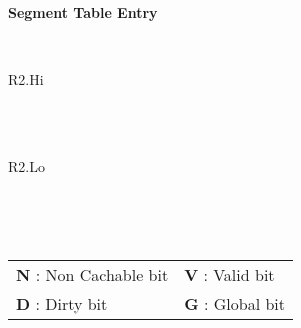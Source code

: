 \begin{minipage}{\textwidth}
\begin{framed}
	\begin{center}
		\textbf{Segment Table Entry}
	\end{center}
	\begin{bytefield}[endianness=big]{32}
		\\
		\begin{rightwordgroup}{R2.Hi}
		   
		\end{rightwordgroup}\\
		\\
		\begin{rightwordgroup}{R2.Lo}
		     
		\end{rightwordgroup}\\
	\end{bytefield}\\
	\begin{tabular}{ll}
	\textbf{N} : Non Cachable bit & \textbf{V} : Valid bit \\
	\textbf{D} : Dirty bit & \textbf{G} : Global bit \\
	\end{tabular}
\end{framed}
\end{minipage}
